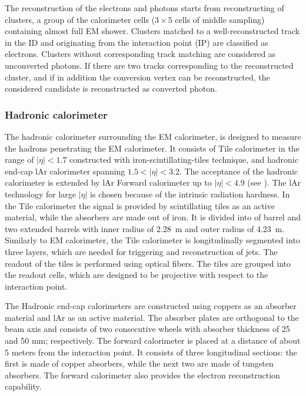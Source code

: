 The reconstruction of the electrons and photons starts from reconstructing of clusters, a group of the calorimeter cells ($3\times 5$ cells of middle sampling) containing almost full EM shower. Clusters matched to a well-reconstructed track in the ID and originating from the interaction point (IP) are classified as electrons. Clusters without corresponding track matching are considered as unconverted photons. If there are two tracks corresponding to the reconstructed cluster, and if in addition the conversion vertex can be reconstructed, the considered candidate is reconstructed as converted photon.

\subsubsection{Hadronic calorimeter}

The hadronic calorimeter surrounding the EM calorimeter, is designed to measure the hadrons penetrating the EM calorimeter.
It consists of Tile calorimeter in the range of $|\eta|<1.7$ constructed with iron-scintillating-tiles technique, and hadronic end-cap lAr calorimeter spanning $1.5<|\eta|<3.2$. The acceptance of the hadronic calorimeter is extended by lAr Forward calorimeter up to $|\eta|<4.9$ (see ). The lAr technology for large $|\eta|$ is chosen because of the
intrinsic radiation hardness.
In the Tile calorimeter the signal is provided by scintillating tiles as an active material, while the absorbers are made out of iron. It is divided into of barrel and two extended barrels with inner radius of 2.28~m and outer radius of 4.23~m. Similarly to EM calorimeter, the Tile calorimeter is longitudinally segmented into three layers, which are needed for triggering and reconstruction of jets. The readout of the tiles is performed using optical fibers. The tiles are grouped into the readout cells, which are designed to be projective with respect to the interaction point.

The Hadronic end-cap calorimeters are constructed using coppers as an absorber material and lAr as an active material. The absorber plates are orthogonal to the beam axis and consists of two consecutive wheels
with absorber thickness of 25 and 50 mm; respectively. The forward calorimeter is placed at a distance of about 5 meters from the interaction point. It consists of three longitudinal sections: the first is made of copper absorbers, while the next two are made of tungsten absorbers. The forward calorimeter also provides the electron reconstruction capability.

